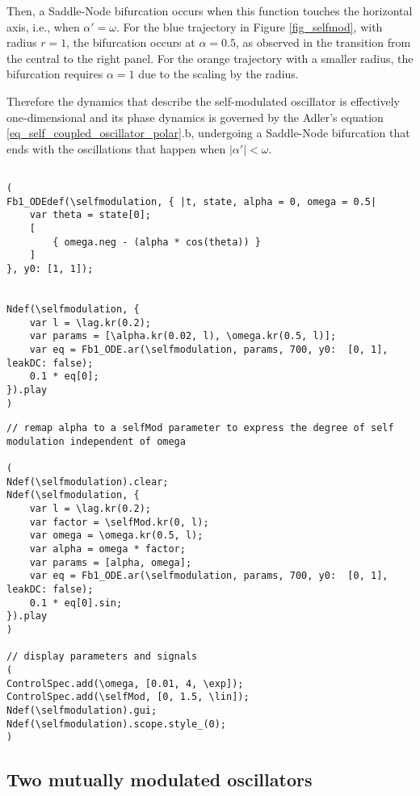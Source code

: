 \documentclass{article}
\begin{document}
Then, a Saddle-Node bifurcation occurs when this function touches the horizontal axis, i.e., when $\alpha' = \omega$. For the blue trajectory in Figure \ref{fig_selfmod}, with radius $r = 1$, the bifurcation occurs at $\alpha = 0.5$, as observed in the transition from the central to the right panel. For the orange trajectory with a smaller radius, the bifurcation requires $\alpha = 1$ due to the scaling by the radius.

Therefore the dynamics that describe the self-modulated oscillator is effectively one-dimensional and its phase dynamics is governed by the Adler's equation \ref{eq_self_coupled_oscillator_polar}.b, undergoing a Saddle-Node bifurcation that ends with the oscillations that happen when $|\alpha'|<\omega$.

\begin{lstlisting}[caption=Reformulation of the simple self-coupled oscillator in polar coordinates.]

(
Fb1_ODEdef(\selfmodulation, { |t, state, alpha = 0, omega = 0.5|
	var theta = state[0];
	[
		{ omega.neg - (alpha * cos(theta)) }
	]
}, y0: [1, 1]);


Ndef(\selfmodulation, {
	var l = \lag.kr(0.2);
	var params = [\alpha.kr(0.02, l), \omega.kr(0.5, l)];
	var eq = Fb1_ODE.ar(\selfmodulation, params, 700, y0:  [0, 1], leakDC: false);
	0.1 * eq[0];
}).play
)

\end{lstlisting}


\begin{lstlisting}[caption=The simple self-coupled oscillator in polar coordinates with a remapped $\alpha$.]
// remap alpha to a selfMod parameter to express the degree of self modulation independent of omega

(
Ndef(\selfmodulation).clear;
Ndef(\selfmodulation, {
	var l = \lag.kr(0.2);
	var factor = \selfMod.kr(0, l);
	var omega = \omega.kr(0.5, l);
	var alpha = omega * factor;
	var params = [alpha, omega];
	var eq = Fb1_ODE.ar(\selfmodulation, params, 700, y0:  [0, 1], leakDC: false);
	0.1 * eq[0].sin;
}).play
)

// display parameters and signals
(
ControlSpec.add(\omega, [0.01, 4, \exp]);
ControlSpec.add(\selfMod, [0, 1.5, \lin]);
Ndef(\selfmodulation).gui;
Ndef(\selfmodulation).scope.style_(0);
)
\end{lstlisting}


\subsection{Two mutually modulated oscillators}
\end{document}
